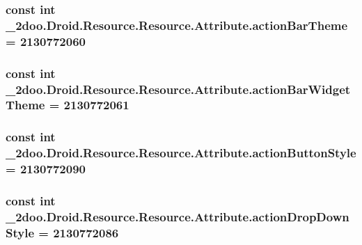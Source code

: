\hypertarget{class__2doo_1_1_droid_1_1_resource_1_1_attribute_b941f605f0d6abd760c9cea16e81e498}{
\subsubsection[{actionBarTheme}]{\setlength{\rightskip}{0pt plus 5cm}const int \_\-2doo.Droid.Resource.Resource.Attribute.actionBarTheme = 2130772060}}
\label{class__2doo_1_1_droid_1_1_resource_1_1_attribute_b941f605f0d6abd760c9cea16e81e498}


\hypertarget{class__2doo_1_1_droid_1_1_resource_1_1_attribute_f2bc0b1ab3136f95222f8bccb7b2d7d2}{
\subsubsection[{actionBarWidgetTheme}]{\setlength{\rightskip}{0pt plus 5cm}const int \_\-2doo.Droid.Resource.Resource.Attribute.actionBarWidgetTheme = 2130772061}}
\label{class__2doo_1_1_droid_1_1_resource_1_1_attribute_f2bc0b1ab3136f95222f8bccb7b2d7d2}


\hypertarget{class__2doo_1_1_droid_1_1_resource_1_1_attribute_7fe0f4abe6c2b781520b593c28ac70a6}{
\subsubsection[{actionButtonStyle}]{\setlength{\rightskip}{0pt plus 5cm}const int \_\-2doo.Droid.Resource.Resource.Attribute.actionButtonStyle = 2130772090}}
\label{class__2doo_1_1_droid_1_1_resource_1_1_attribute_7fe0f4abe6c2b781520b593c28ac70a6}


\hypertarget{class__2doo_1_1_droid_1_1_resource_1_1_attribute_23be8af7900df23ff2d0ebbf5905200e}{
\subsubsection[{actionDropDownStyle}]{\setlength{\rightskip}{0pt plus 5cm}const int \_\-2doo.Droid.Resource.Resource.Attribute.actionDropDownStyle = 2130772086}}
\label{class__2doo_1_1_droid_1_1_resource_1_1_attribute_23be8af7900df23ff2d0ebbf5905200e}


